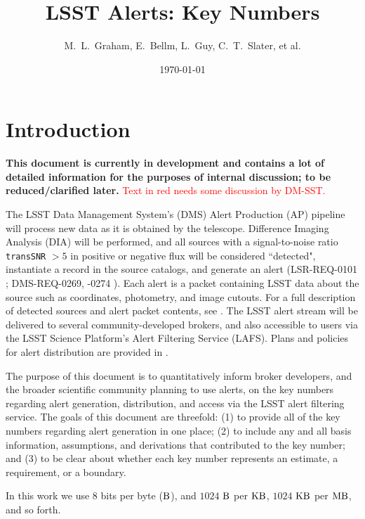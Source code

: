 \documentclass[DM,authoryear,toc]{lsstdoc}
\title[Alerts Key Numbers]{LSST Alerts: Key Numbers}
\author{%
M.~L.~Graham, E.~Bellm, L.~Guy, C.~T.~Slater, et al.
}
\date{\today}
\begin{document}
\maketitle

\section{Introduction} \label{sec:intro}

{\bf This document is currently in development and contains a lot of detailed information for the purposes of internal discussion; to be reduced/clarified later.} \textcolor{red}{Text in red needs some discussion by DM-SST.}

The LSST Data Management System's (DMS) Alert Production (AP) pipeline will process new data as it is obtained by the telescope. Difference Imaging Analysis (DIA) will be performed, and all sources with a signal-to-noise ratio {\tt transSNR} $>5$ in positive or negative flux will be considered ``detected", instantiate a record in the source catalogs, and generate an alert (LSR-REQ-0101 ; DMS-REQ-0269, -0274 ). Each alert is a packet containing LSST data about the source such as coordinates, photometry, and image cutouts. For a full description of detected sources and alert packet contents, see . The LSST alert stream will be delivered to several community-developed brokers, and also accessible to users via the LSST Science Platform's Alert Filtering Service (LAFS). Plans and policies for alert distribution are provided in . 

The purpose of this document is to quantitatively inform broker developers, and the broader scientific community planning to use alerts, on the key numbers regarding alert generation, distribution, and access via the LSST alert filtering service. The goals of this document are threefold: (1) to provide all of the key numbers regarding alert generation in one place; (2) to include any and all basis information, assumptions, and derivations that contributed to the key number; and (3) to be clear about whether each key number represents an estimate, a requirement, or a boundary. 

In this work we use 8 bits per byte ($\rm B$), and $1024$ $\rm B$ per $\rm KB$, $1024$ $\rm KB$ per $\rm MB$, and so forth.
\end{document}
